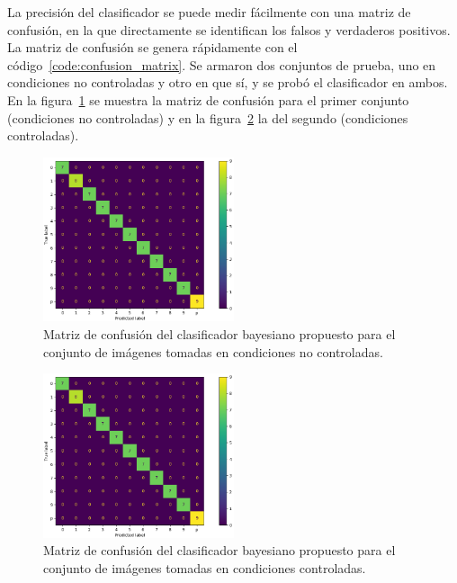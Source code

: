 La precisión del clasificador se puede medir fácilmente con una matriz de confusión, en la que directamente se identifican los falsos y verdaderos positivos.
La matriz de confusión se genera rápidamente con el código~\ref{code:confusion_matrix}.
Se armaron dos conjuntos de prueba, uno en condiciones no controladas y otro en que sí, y se probó el clasificador en ambos.
En la figura~\ref{fig:confusion_matrix_bad} se muestra la matriz de confusión para el primer conjunto (condiciones no controladas) y en la figura~\ref{fig:confusion_matrix_good} la del segundo (condiciones controladas).
\vfill
%
\begin{figure}[h!]
    \caption{Matriz de confusión del clasificador bayesiano propuesto para el conjunto de imágenes tomadas en condiciones no controladas.}
    \label{fig:confusion_matrix_bad}
    \centering
    \includegraphics[width=0.5\textwidth]{3_Reconocimiento/Figs/confusion_matrix_good}
\end{figure}
%
\begin{figure}[h!]
    \caption{Matriz de confusión del clasificador bayesiano propuesto para el conjunto de imágenes tomadas en condiciones controladas.}
    \label{fig:confusion_matrix_good}
    \centering
    \includegraphics[width=0.5\textwidth]{3_Reconocimiento/Figs/confusion_matrix_good}
\end{figure}


